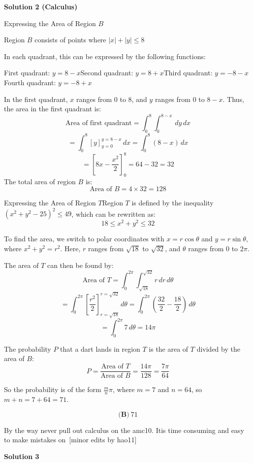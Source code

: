 \begin{enumerate}
\textbf{Solution 2 (Calculus)}

Expressing the Area of Region \( B \)

 Region \( B \) consists of points where \( |x| + |y| \le 8 \)

 In each quadrant, this can be expressed by the following functions:

 First quadrant: \( y = 8 - x \)Second quadrant: \( y = 8 + x \)Third quadrant: \( y = -8 - x \)Fourth quadrant: \( y = -8 + x \)

 In the first quadrant, \( x \) ranges from 0 to 8, and \( y \) ranges from 0 to \( 8 - x \). Thus, the area in the first quadrant is:
 \[\text{Area of first quadrant} = \int_0^8 \int_0^{8 - x} \, dy \, dx\]
 \[= \int_0^8 [y]_{y=0}^{y=8-x} \, dx = \int_0^8 (8 - x) \, dx\]
 \[= \left[ 8x - \frac{x^2}{2} \right]_0^8 = 64 - 32 = 32\]The total area of region \( B \) is:
 \[\text{Area of } B = 4 \times 32 = 128\]

 Expressing the Area of Region \( T \)Region \( T \) is defined by the inequality \( (x^2 + y^2 - 25)^2 \le 49 \), which can be rewritten as:
 \[18 \le x^2 + y^2 \le 32\]

 To find the area, we switch to polar coordinates with \( x = r \cos \theta \) and \( y = r \sin \theta \), where \( x^2 + y^2 = r^2 \). Here, \( r \) ranges from \( \sqrt{18} \) to \( \sqrt{32} \), and \( \theta \) ranges from 0 to \( 2\pi \).

 The area of \( T \) can then be found by:
 \[\text{Area of } T = \int_0^{2\pi} \int_{\sqrt{18}}^{\sqrt{32}} r \, dr \, d\theta\]
 \[= \int_0^{2\pi} \left[ \frac{r^2}{2} \right]_{r=\sqrt{18}}^{r=\sqrt{32}} \, d\theta = \int_0^{2\pi} \left( \frac{32}{2} - \frac{18}{2} \right) \, d\theta\]
 \[= \int_0^{2\pi} 7 \, d\theta = 14\pi\]

 The probability \( P \) that a dart lands in region \( T \) is the area of \( T \) divided by the area of \( B \):
 \[P = \frac{\text{Area of } T}{\text{Area of } B} = \frac{14\pi}{128} = \frac{7\pi}{64}\]

 So the probability is of the form \( \frac{m}{n} \pi \), where \( m = 7 \) and \( n = 64 \), so \( m + n = 7 + 64 = 71 \).

 
 \[\boxed{\textbf{(B)}\ 71}\]

 By the way never pull out calculus on the amc10. Itis time consuming and easy to make mistakes on~[minor edits by hao11]

 



\textbf{Solution 3}



\end{enumerate}
